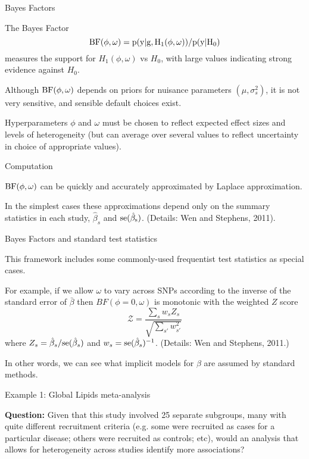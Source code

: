 \documentclass[ignorenonframetext]{beamer}
\def\BF{\text{BF}}
\def\BF{\rm BF}
\begin{document}
\begin{frame}{Bayes Factors}

The Bayes Factor
$$\BF(\phi,\omega) = p(y | g, H_1(\phi, \omega)) / p(y | H_0)$$
measures the support for $H_1(\phi,\omega)$ vs $H_0$, with large
values indicating strong evidence against $H_0$.

\bigskip
Although $\BF(\phi,\omega)$ depends on priors for nuisance parameters $(\mu,\sigma^2_s)$, it is not very sensitive,
and sensible default choices exist.

\bigskip 
Hyperparameters $\phi$ and $\omega$ must be chosen to reflect expected effect sizes and levels of heterogeneity
(but can average over several values to reflect uncertainty in choice of appropriate values).
\end{frame}

\begin{frame}{Computation}

$\BF(\phi,\omega)$ can be quickly and accurately approximated by Laplace approximation.

\bigskip

In the simplest cases these approximations depend only on the summary statistics
in each study, $\hat\beta_s$ and $\rm{se}(\hat\beta_s)$.
(Details: Wen and Stephens, 2011).
\end{frame}


\begin{frame}{Bayes Factors and standard test statistics}

This framework includes some commonly-used frequentist test statistics as special cases.
\bigskip

For example, if we allow $\omega$ to vary across SNPs according to the inverse
of the standard error of $\bar \beta$ then $BF(\phi=0, \omega)$ is monotonic with the weighted $Z$ score
\begin{equation} \label{weighted.Zscores.eqn}
\mathcal{Z} = \frac{\sum_s w_s Z_s}{\sqrt{\sum_{s'} w_{s'}^2}}
\end{equation}
where $Z_s=\hat\beta_s/ {\rm se}(\hat{\beta}_s)$ and $w_s =  {\rm se}(\hat{\beta}_s)^{-1}$. (Details: Wen and Stephens, 2011.)

\bigskip
In other words, we can see what implicit models for $\beta$ are assumed by standard methods.
\end{frame}

\begin{frame}{Example 1: Global Lipids meta-analysis}

{\bf Question:} Given that this study involved 25 separate subgroups, many with quite different recruitment criteria
(e.g. some were recruited as cases for a particular disease; others were recruited as controls; etc),
would an analysis that allows for heterogeneity across studies identify more associations?
 
 \bigskip
 
 \end{frame}
 
\end{document}
